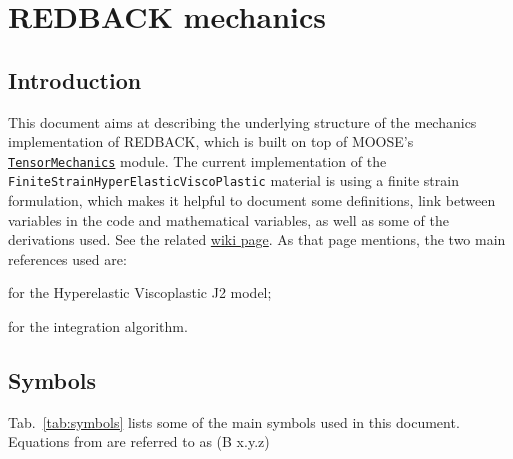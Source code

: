 \documentclass[]{scrreprt}
\newcommand{\moose}{{MOOSE}}
\newcommand{\redback}{{REDBACK}}
\begin{document}
\newif\ifshowallderivations %
\showallderivationstrue




\chapter{\redback{} mechanics}
\section{Introduction}
This document aims at describing the underlying structure of the mechanics implementation of \redback{}, which is built on top of \moose{}'s \href{http://mooseframework.org/wiki/PhysicsModules/TensorMechanics}{\texttt{TensorMechanics}} module. The current implementation of the \texttt{FiniteStrainHyperElasticViscoPlastic} material is using a finite strain formulation, which makes it helpful to document some definitions, link between variables in the code and mathematical variables, as well as some of the derivations used. See the related \href{http://mooseframework.org/wiki/PhysicsModules/TensorMechanics/HyperelasticViscoplastic/}{wiki page}. As that page mentions, the two main references used are:
\begin{list}{}{}
  \item \citep{Belytschko2014} for the Hyperelastic Viscoplastic J2 model;
  \item \citep{Ling2005} for the integration algorithm.
\end{list}



\section{Symbols}
Tab.~\ref{tab:symbols} lists some of the main symbols used in this document. Equations from \citep{Belytschko2014} are referred to as (B x.y.z)
\end{document}
